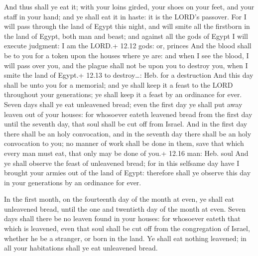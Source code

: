  And thus shall ye eat it; with your loins girded, your
shoes on your feet, and your staff in your hand; and ye shall eat it in
haste: it is the LORD's passover.  For I will pass through
the land of Egypt this night, and will smite all the firstborn in the
land of Egypt, both man and beast; and against all the gods of Egypt I
will execute judgment: I am the LORD.+ 12.12 gods: or, princes
 And the blood shall be to you for a token upon the houses
where ye are: and when I see the blood, I will pass over you, and the
plague shall not be upon you to destroy you, when I smite the land of
Egypt.+ 12.13 to destroy\ldots: Heb. for a destruction  And
this day shall be unto you for a memorial; and ye shall keep it a feast
to the LORD throughout your generations; ye shall keep it a feast by an
ordinance for ever.  Seven days shall ye eat unleavened
bread; even the first day ye shall put away leaven out of your houses:
for whosoever eateth leavened bread from the first day until the seventh
day, that soul shall be cut off from Israel.  And in the
first day there shall be an holy convocation, and in the seventh day
there shall be an holy convocation to you; no manner of work shall be
done in them, save that which every man must eat, that only may be done
of you.+ 12.16 man: Heb. soul  And ye shall observe the
feast of unleavened bread; for in this selfsame day have I brought your
armies out of the land of Egypt: therefore shall ye observe this day in
your generations by an ordinance for ever.

 In the first month, on the fourteenth day of the month
at even, ye shall eat unleavened bread, until the one and twentieth day
of the month at even.  Seven days shall there be no leaven
found in your houses: for whosoever eateth that which is leavened, even
that soul shall be cut off from the congregation of Israel, whether he
be a stranger, or born in the land.  Ye shall eat nothing
leavened; in all your habitations shall ye eat unleavened bread.

